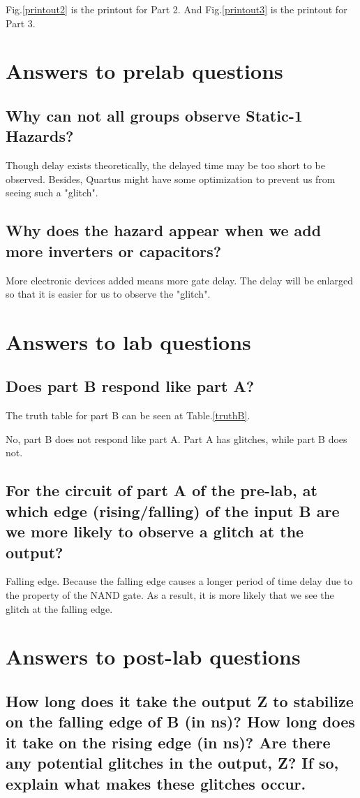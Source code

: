 \documentclass[11pt]{article}
\begin{document}
Fig.\ref{printout2} is the printout for Part 2. And Fig.\ref{printout3} is the printout for Part 3.

\section{Answers to prelab questions}
\subsection{Why can not all groups observe Static-1 Hazards?}
Though delay exists theoretically, the delayed time may be too short to be observed. Besides, Quartus might have some optimization to prevent us from seeing such a "glitch".

\subsection{Why does the hazard appear when we add more inverters or capacitors?}
More electronic devices added means more gate delay. The delay will be enlarged so that it is easier for us to observe the "glitch".

\section{Answers to lab questions}
\subsection{Does part B respond like part A?}
The truth table for part B can be seen at Table.\ref{truthB}.

No, part B does not respond like part A. Part A has glitches, while part B does not.

\subsection{For the circuit of part A of the pre-lab, at which edge (rising/falling) of the input B are we more likely to observe a glitch at the output?}
Falling edge. Because the falling edge causes a longer period of time delay due to the property of the NAND gate. As a result, it is more likely that we see the glitch at the falling edge.


\section{Answers to post-lab questions}
\subsection{How long does it take the output Z to stabilize on the falling edge of B (in ns)? How long does it take on the rising edge (in ns)? Are there any potential glitches in the output, Z? If so, explain what makes these glitches occur.}
\end{document}
